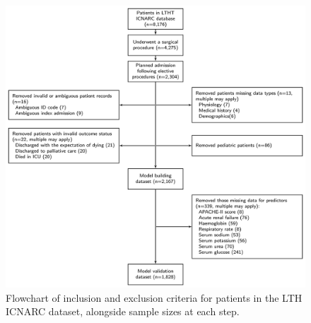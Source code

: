 \documentclass[onecolumn]{article}
\begin{document}
\begin{figure}[h]
\centering
	\includegraphics[width=\textwidth]{flowchart_icnarc.png}
  \caption{Flowchart of inclusion and exclusion criteria for patients in the LTH ICNARC dataset, alongside sample sizes at each step.}
  \label{FlowchartICNARC}
\end{figure}
\end{document}
